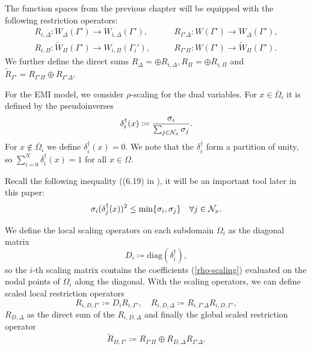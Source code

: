 The function spaces from the previous chapter will be equipped with the following restriction operators:
\begin{equation*}
    \begin{split}
        R_{i, \Delta}: W_{\Delta}(\Gamma')\rightarrow W_{i, \Delta}(\Gamma'), \quad \quad & R_{\Gamma' \Delta}: W(\Gamma') \rightarrow W_{\Delta}(\Gamma'), \\
        R_{i, \Pi}: \widetilde W_{\Pi}(\Gamma') \rightarrow W_{i, \Pi}(\Gamma_i'), \quad \quad & R_{\Gamma' \Pi}: W(\Gamma') \rightarrow\widetilde W_{\Pi}(\Gamma').
    \end{split}
\end{equation*}
We further define the direct sums $R_{\Delta} = \oplus R_{i, \Delta}, R_{\Pi} = \oplus R_{i, \Pi}$ and $\widetilde R_{\Gamma'} = R_{\Gamma' \Pi} \oplus R_{\Gamma' \Delta}$.

For the EMI model, we consider $\rho$-scaling for the dual variables. For $x \in \overline{\Omega}_i$ it is defined by the pseudoinverses
\begin{equation}
    \label{rho-scaling}
    \delta_i^{\dag}(x) \coloneqq \frac{\sigma_i}{\sum_{j \in \mathcal{N}_x} \sigma_j}.
\end{equation}
For $x \notin \overline{\Omega}_i$ we define $\delta_i^{\dag}(x) = 0$. We note that the $\delta_i^{\dag}$ form a partition of unity, so $\sum_{i = 0}^N \delta_i^{\dag} (x) = 1$ for all $x \in \Omega$.

Recall the following inequality ((6.19) in \cite{dd-book}), it will be an important tool later in this paper:
\begin{equation}
    \label{sigma-ineq}
    \sigma_i (\delta_j^\dag(x))^2 \leq \min\{\sigma_i, \sigma_j\} \quad \forall j \in \mathcal{N}_x.
\end{equation}

We define the local scaling operators on each subdomain $\Omega_i$ as the diagonal matrix
\begin{equation}
    D_i \coloneqq \text{diag}(\delta_i^{\dag}),
\end{equation}
so the $i$-th scaling matrix contains the coefficients (\ref{rho-scaling}) evaluated on the nodal points of $\Omega_i$ along the diagonal. With the scaling operators, we can define scaled local restriction operators
\[R_{i, D, \Gamma'} \coloneqq D_iR_{i, \Gamma'},\quad R_{i,D,\Delta} \coloneqq R_{i,\Gamma'\Delta}R_{i,D,\Gamma'},\]
$R_{D,\Delta}$ as the direct sum of the $R_{i,D,\Delta}$ and finally the global scaled restriction operator 
\[\widetilde R_{D,\Gamma'} \coloneqq R_{\Gamma'\Pi} \oplus R_{D,\Delta}R_{\Gamma'\Delta}.\]

